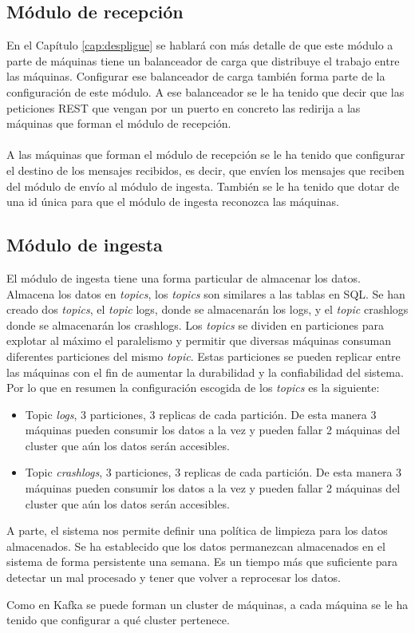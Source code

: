\subsection{Módulo de recepción}

En el Capítulo \ref{cap:despligue} se hablará con más detalle de que este módulo a parte de máquinas tiene un balanceador de carga que distribuye el trabajo entre las máquinas. Configurar ese balanceador de carga también forma parte de la configuración de este módulo. A ese balanceador se le ha tenido que decir que las peticiones REST que vengan por un puerto en concreto las redirija a las máquinas que forman el módulo de recepción.
\\\\
A las máquinas que forman el módulo de recepción se le ha tenido que configurar el destino de los mensajes recibidos, es decir, que envíen los mensajes que reciben del módulo de envío al módulo de ingesta. También se le ha tenido que dotar de una id única para que el módulo de ingesta reconozca las máquinas.

\subsection{Módulo de ingesta}

El módulo de ingesta tiene una forma particular de almacenar los datos. Almacena los datos en \textit{topics}, los \textit{topics} son similares a las tablas en SQL. Se han creado dos \textit{topics}, el \textit{topic} logs, donde se almacenarán los logs, y el \textit{topic} crashlogs donde se almacenarán los crashlogs. Los \textit{topics} se dividen en particiones para explotar al máximo el paralelismo y permitir que diversas máquinas consuman diferentes particiones del mismo \textit{topic}. Estas particiones se pueden replicar entre las máquinas con el fin de aumentar la durabilidad y la confiabilidad del sistema. Por lo que en resumen la configuración escogida de los \textit{topics} es la siguiente:

\begin{itemize}
	\item Topic \textit{logs}, 3 particiones, 3 replicas de cada partición. De esta manera 3 máquinas pueden consumir los datos a la vez y pueden fallar 2 máquinas del cluster que aún los datos serán accesibles.
	\item Topic \textit{crashlogs}, 3 particiones, 3 replicas de cada partición. De esta manera 3 máquinas pueden consumir los datos a la vez y pueden fallar 2 máquinas del cluster que aún los datos serán accesibles.
\end{itemize}

A parte, el sistema nos permite definir una política de limpieza para los datos almacenados. Se ha establecido que los datos permanezcan almacenados en el sistema de forma persistente una semana. Es un tiempo más que suficiente para detectar un mal procesado y tener que volver a reprocesar los datos.

Como en Kafka se puede forman un cluster de máquinas, a cada máquina se le ha tenido que configurar a qué cluster pertenece.




